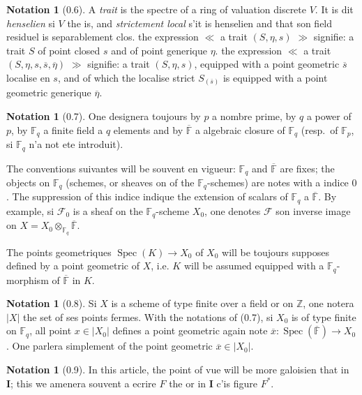 \documentclass[12pt,a4paper]{article}
\theoremstyle{plain}
\theoremstyle{definition}
\newtheorem{notation}[theorem]{Notation}
\theoremstyle{definition}
\theoremstyle{remark}
\DeclareMathOperator{\Spec}{Spec}
\begin{document}
\begin{notation}[0.6]
A \emph{trait} is the spectre of a ring of valuation discrete $V$. It is dit \emph{henselien} si $V$ the is, and \emph{strictement local} s'it is henselien and that son field residuel is separablement clos. the expression $\ll$ a trait $(S, \eta, s)$ $\gg$ signifie: a trait $S$ of point closed $s$ and of point generique $\eta$. the expression $\ll$ a trait $(S, \eta, s, \overline{s}, \overline{\eta})$ $\gg$ signifie: a trait $(S, \eta, s)$, equipped with a point geometric $\overline{s}$ localise en $s$, and of which the localise strict $S_{(\overline{s})}$ is equipped with a point geometric generique $\overline{\eta}$.
\end{notation}

\begin{notation}[0.7]
One designera toujours by $p$ a nombre prime, by $q$ a power of $p$, by $\mathbb{F}_q$ a finite field a $q$ elements and by $\overline{\mathbb{F}}$ a algebraic closure of $\mathbb{F}_q$ (resp.~of $\mathbb{F}_p$, si $\mathbb{F}_q$ n'a not ete introduit).

The conventions suivantes will be souvent en vigueur: $\mathbb{F}_q$ and $\overline{\mathbb{F}}$ are fixes; the objects on $\mathbb{F}_q$ (schemes, or sheaves on of the $\mathbb{F}_q$-schemes) are notes with a indice $0$. The suppression of this indice indique the extension of scalars of $\mathbb{F}_q$ a $\overline{\mathbb{F}}$. By example, si $\mathscr{F}_0$ is a sheaf on the $\mathbb{F}_q$-scheme $X_0$, one denotes $\mathscr{F}$ son inverse image on $X = X_0 \otimes_{\mathbb{F}_q} \overline{\mathbb{F}}$.

The points geometriques $\Spec(K) \to X_0$ of $X_0$ will be toujours supposes defined by a point geometric of $X$, i.e. $K$ will be assumed equipped with a $\mathbb{F}_q$-morphism of $\overline{\mathbb{F}}$ in $K$.
\end{notation}

\begin{notation}[0.8]
Si $X$ is a scheme of type finite over a field or on $\mathbb{Z}$, one notera $|X|$ the set of ses points fermes. With the notations of (0.7), si $X_0$ is of type finite on $\mathbb{F}_q$, all point $x \in |X_0|$ defines a point geometric again note $\overline{x}: \Spec(\overline{\mathbb{F}}) \to X_0$. One parlera simplement of the point geometric $\overline{x} \in |X_0|$.
\end{notation}

\begin{notation}[0.9]
In this article, the point of vue will be more galoisien that in \textbf{I}; this we amenera souvent a ecrire $F$ the or in \textbf{I} c'is figure $F^*$.
\end{notation}
\end{document}
